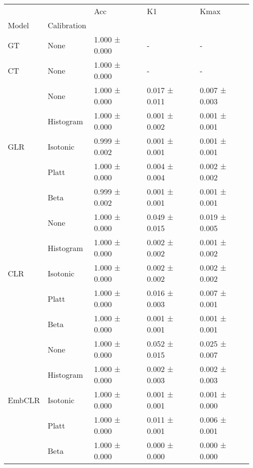 \begin{tabular}{lllll}
\toprule
 &  & Acc & K1 & Kmax \\
Model & Calibration &  &  &  \\
\midrule
GT & None & 1.000 ± 0.000 & - & - \\
\cline{1-5}
CT & None & 1.000 ± 0.000 & - & - \\
\cline{1-5}
\multirow[t]{5}{*}{GLR} & None & 1.000 ± 0.000 & 0.017 ± 0.011 & 0.007 ± 0.003 \\
 & Histogram & 1.000 ± 0.000 & 0.001 ± 0.002 & 0.001 ± 0.001 \\
 & Isotonic & 0.999 ± 0.002 & 0.001 ± 0.001 & 0.001 ± 0.001 \\
 & Platt & 1.000 ± 0.000 & 0.004 ± 0.004 & 0.002 ± 0.002 \\
 & Beta & 0.999 ± 0.002 & 0.001 ± 0.001 & 0.001 ± 0.001 \\
\cline{1-5}
\multirow[t]{5}{*}{CLR} & None & 1.000 ± 0.000 & 0.049 ± 0.015 & 0.019 ± 0.005 \\
 & Histogram & 1.000 ± 0.000 & 0.002 ± 0.002 & 0.001 ± 0.002 \\
 & Isotonic & 1.000 ± 0.000 & 0.002 ± 0.002 & 0.002 ± 0.002 \\
 & Platt & 1.000 ± 0.000 & 0.016 ± 0.003 & 0.007 ± 0.001 \\
 & Beta & 1.000 ± 0.000 & 0.001 ± 0.001 & 0.001 ± 0.001 \\
\cline{1-5}
\multirow[t]{5}{*}{EmbCLR} & None & 1.000 ± 0.000 & 0.052 ± 0.015 & 0.025 ± 0.007 \\
 & Histogram & 1.000 ± 0.000 & 0.002 ± 0.003 & 0.002 ± 0.003 \\
 & Isotonic & 1.000 ± 0.000 & 0.001 ± 0.001 & 0.001 ± 0.000 \\
 & Platt & 1.000 ± 0.000 & 0.011 ± 0.001 & 0.006 ± 0.001 \\
 & Beta & 1.000 ± 0.000 & 0.000 ± 0.000 & 0.000 ± 0.000 \\
\cline{1-5}
\bottomrule
\end{tabular}
